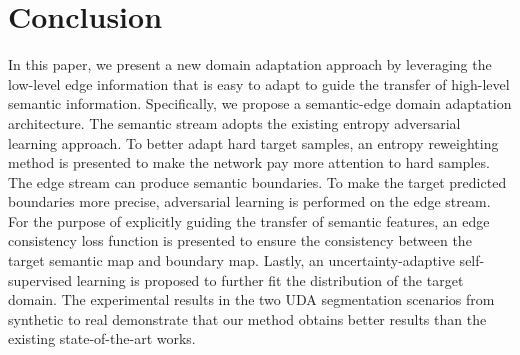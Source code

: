 \documentclass[sigconf]{acmart}
\begin{document}
\section{Conclusion}
\par  In this paper, we present a new domain adaptation approach by leveraging the low-level edge information that is easy to adapt to guide the transfer of high-level semantic information. Specifically, we propose a semantic-edge domain adaptation architecture. The semantic stream adopts the existing entropy adversarial learning approach. To better adapt hard target samples, an entropy reweighting method is presented to make the network pay more attention to hard samples. The edge stream can produce semantic boundaries. To make the target predicted boundaries more precise, adversarial learning is performed on the edge stream. For the purpose of explicitly guiding the transfer of semantic features, an edge consistency loss function is presented to ensure the consistency between the target semantic map and boundary map. Lastly, an uncertainty-adaptive self-supervised learning is proposed to further fit the distribution of the target domain. The experimental results in the two UDA segmentation scenarios from synthetic to real demonstrate that our method obtains better results than the existing state-of-the-art works.






\end{document}
